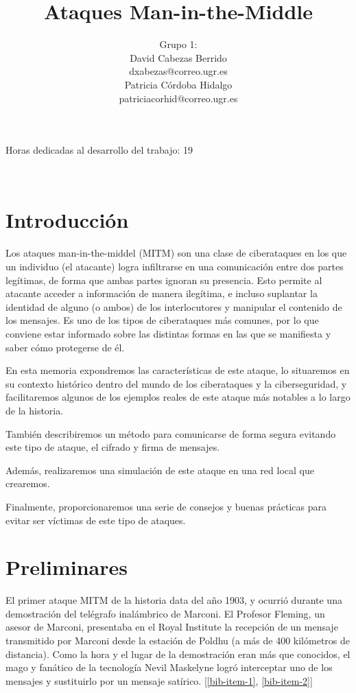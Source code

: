 \documentclass[11pt]{article}
\title{\Huge Ataques Man-in-the-Middle \vspace{10mm}}
\author{\Large Grupo 1: \vspace{10mm} \\
	\Large David Cabezas Berrido \vspace{5mm} \\ 
  \Large dxabezas@correo.ugr.es \vspace{10mm} \\
  \Large Patricia Córdoba Hidalgo \vspace{5mm} \\ 
	\Large patriciacorhid@correo.ugr.es \vspace{10mm}}
\begin{document}
\maketitle
\vfill
\begin{flushleft}
{\Large Horas dedicadas al desarrollo del trabajo: 19}
\end{flushleft}
\vspace{40mm}
~
\newpage
\tableofcontents
\newpage

\section{Introducción}

Los ataques man-in-the-middel (MITM) son una clase de ciberataques en los que un individuo (el atacante) logra infiltrarse en una
comunicación entre dos partes legítimas, de forma que ambas partes ignoran su presencia. Esto permite al atacante acceder a información
de manera ilegítima, e incluso suplantar la identidad de alguno (o ambos) de los interlocutores y manipular el contenido de los mensajes. Es uno de los tipos de ciberataques más comunes, por lo que conviene estar informado sobre las distintas formas
en las que se manifiesta y saber cómo protegerse de él.

En esta memoria expondremos las características de este ataque, lo situaremos en su contexto histórico dentro del mundo de los ciberataques y la
 ciberseguridad, y facilitaremos algunos de los ejemplos reales de este ataque más notables a lo largo de la historia.
 
 También describiremos un método para comunicarse de forma segura evitando este tipo de ataque, el cifrado y firma de mensajes.
 
Además, realizaremos una simulación de este ataque en una red local que crearemos.

Finalmente, proporcionaremos una serie de consejos y buenas prácticas para evitar ser víctimas de este tipo de ataques.

\section{Preliminares}

El primer ataque MITM de la historia data del año 1903, y ocurrió durante una demostración del telégrafo inalámbrico de Marconi.
El Profesor Fleming, un asesor de Marconi, presentaba en el Royal Institute la recepción de un mensaje transmitido por Marconi desde la estación de
 Poldhu (a más de 400 kilómetros de distancia). Como la hora y el lugar de la demostración eran más que conocidos, el mago y fanático de la
tecnología Nevil Maskelyne logró interceptar uno de los mensajes y sustituirlo por un mensaje satírico. [\ref{bib-item-1}, \ref{bib-item-2}]
\end{document}
